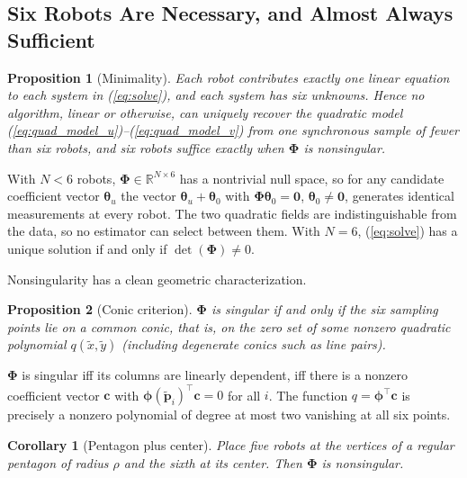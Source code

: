 \documentclass[lettersize,journal]{IEEEtran}
\newtheorem{proposition}{Proposition}
\newtheorem{corollary}{Corollary}
\begin{document}
\subsection{Six Robots Are Necessary, and Almost Always Sufficient}

\begin{proposition}[Minimality]
\label{prop:minimality}
Each robot contributes exactly one linear equation to each system in
(\ref{eq:solve}), and each system has six unknowns. Hence no algorithm,
linear or otherwise, can uniquely recover the quadratic model
(\ref{eq:quad_model_u})--(\ref{eq:quad_model_v}) from one synchronous
sample of fewer than six robots, and six robots suffice exactly when
$\boldsymbol{\Phi}$ is nonsingular.
\end{proposition}

\begin{IEEEproof}
With $N < 6$ robots, $\boldsymbol{\Phi} \in \mathbb{R}^{N \times 6}$ has
a nontrivial null space, so for any candidate coefficient vector
$\boldsymbol{\theta}_u$ the vector $\boldsymbol{\theta}_u +
\boldsymbol{\theta}_0$ with $\boldsymbol{\Phi}\boldsymbol{\theta}_0 =
\mathbf{0}$, $\boldsymbol{\theta}_0 \neq \mathbf{0}$, generates identical
measurements at every robot. The two quadratic fields are
indistinguishable from the data, so no estimator can select between
them. With $N = 6$, (\ref{eq:solve}) has a unique solution if and only if
$\det(\boldsymbol{\Phi}) \neq 0$.
\end{IEEEproof}

Nonsingularity has a clean geometric characterization.

\begin{proposition}[Conic criterion]
\label{prop:conic}
$\boldsymbol{\Phi}$ is singular if and only if the six sampling points
lie on a common conic, that is, on the zero set of some nonzero quadratic
polynomial $q(\tilde{x}, \tilde{y})$ (including degenerate conics such as
line pairs).
\end{proposition}

\begin{IEEEproof}
$\boldsymbol{\Phi}$ is singular iff its columns are linearly dependent,
iff there is a nonzero coefficient vector $\mathbf{c}$ with
$\boldsymbol{\phi}(\tilde{\mathbf{p}}_i)^\top \mathbf{c} = 0$ for all
$i$. The function $q = \boldsymbol{\phi}^\top \mathbf{c}$ is precisely a
nonzero polynomial of degree at most two vanishing at all six points.
\end{IEEEproof}

\begin{corollary}[Pentagon plus center]
\label{cor:pentagon}
Place five robots at the vertices of a regular pentagon of radius $\rho$
and the sixth at its center. Then $\boldsymbol{\Phi}$ is nonsingular.
\end{corollary}
\end{document}
